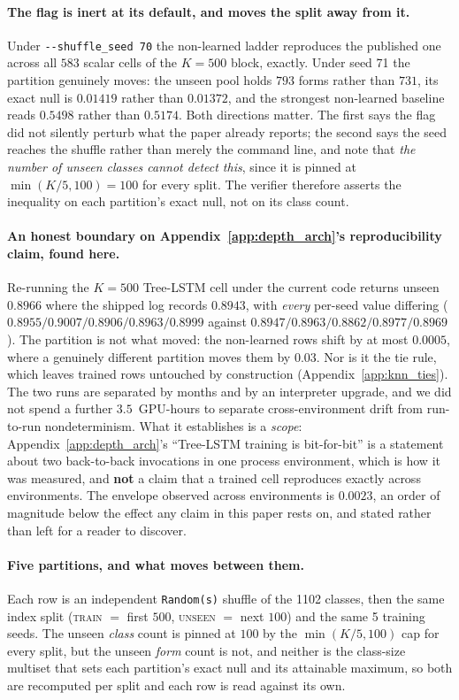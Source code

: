 \paragraph{The flag is inert at its default, and moves the split away from it.} Under \texttt{-{}-shuffle\_seed 70} the non-learned ladder reproduces the published one across all $583$ scalar cells of the $K{=}500$ block, exactly. Under seed 71 the partition genuinely moves: the unseen pool holds $793$ forms rather than $731$, its exact null is $0.01419$ rather than $0.01372$, and the strongest non-learned baseline reads $0.5498$ rather than $0.5174$. Both directions matter. The first says the flag did not silently perturb what the paper already reports; the second says the seed reaches the shuffle rather than merely the command line, and note that \emph{the number of unseen classes cannot detect this}, since it is pinned at $\min(K/5,100){=}100$ for every split. The verifier therefore asserts the inequality on each partition's exact null, not on its class count.

\paragraph{An honest boundary on Appendix~\ref{app:depth_arch}'s reproducibility claim, found here.} Re-running the $K{=}500$ Tree-LSTM cell under the current code returns unseen $0.8966$ where the shipped log records $0.8943$, with \emph{every} per-seed value differing ($0.8955/0.9007/0.8906/0.8963/0.8999$ against $0.8947/0.8963/0.8862/0.8977/0.8969$). The partition is not what moved: the non-learned rows shift by at most $0.0005$, where a genuinely different partition moves them by $0.03$. Nor is it the tie rule, which leaves trained rows untouched by construction (Appendix~\ref{app:knn_ties}). The two runs are separated by months and by an interpreter upgrade, and we did not spend a further $3.5$~GPU-hours to separate cross-environment drift from run-to-run nondeterminism. What it establishes is a \emph{scope}: Appendix~\ref{app:depth_arch}'s ``Tree-LSTM training is bit-for-bit'' is a statement about two back-to-back invocations in one process environment, which is how it was measured, and \textbf{not} a claim that a trained cell reproduces exactly across environments. The envelope observed across environments is $0.0023$, an order of magnitude below the effect any claim in this paper rests on, and stated rather than left for a reader to discover.

\paragraph{Five partitions, and what moves between them.} Each row is an independent \texttt{Random(s)} shuffle of the 1102 classes, then the same index split (\textsc{train} $=$ first $500$, \textsc{unseen} $=$ next $100$) and the same 5 training seeds. The unseen \emph{class} count is pinned at $100$ by the $\min(K/5,100)$ cap for every split, but the unseen \emph{form} count is not, and neither is the class-size multiset that sets each partition's exact null and its attainable maximum, so both are recomputed per split and each row is read against its own.

